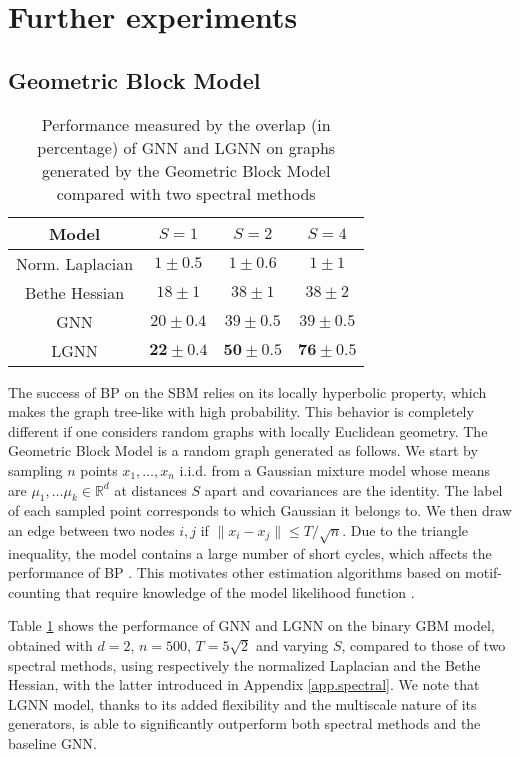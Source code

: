 \documentclass{article} \usepackage{iclr2019_conference,times}
\begin{document}
 

\section{Further experiments}
\subsection{Geometric Block Model}
\label{GBMsec}

\begin{table}[h]
\centering
\caption{\footnotesize{Performance measured by the overlap (in percentage) of GNN and LGNN on graphs generated by the Geometric Block Model compared with two spectral methods}}
\label{gbm_table}
{\small 
\begin{tabular}{|c|c|c|c|}
\hline
Model & $S=1$ & $S=2$  & $S=4$ \\
\hline 
Norm. Laplacian  & $1 \pm 0.5$ & $1 \pm 0.6$ & $1 \pm 1$ \\
Bethe Hessian & $18 \pm 1$ &  $38 \pm 1$ & $38 \pm 2$ \\
GNN & $20 \pm 0.4$  & $39 \pm 0.5$ & $39 \pm 0.5$ \\
LGNN & $\mathbf{22\pm 0.4}$  & $\mathbf{50 \pm 0.5}$ & $\mathbf{76 \pm 0.5}$ \\
\hline 
\end{tabular}
}
\end{table}


The success of BP on the SBM relies on its locally hyperbolic property, 
which makes the graph tree-like with high probability. This behavior is completely different if one 
considers random graphs with locally Euclidean geometry. 
The Geometric Block Model \citep{sankararaman2018community} is a random graph generated as follows. 
We start by sampling $n$ points $x_1,\dots, x_n$ i.i.d. from a Gaussian mixture model whose means are
$\mu_1, \dots \mu_k \in \mathbb{R}^d$ at distances $S$ apart and covariances are the identity. 
The label of each sampled point corresponds to which Gaussian it belongs to.
We then draw an edge between two nodes $i, j$ if $\| x_i - x_j\| \leq T/\sqrt{n}$. 
Due to the triangle inequality, the model contains a large number of short cycles, which affects 
the performance of BP \citep{information2009mezard}. This motivates other estimation algorithms 
based on motif-counting  that require knowledge of the model likelihood function \citep{sankararaman2018community}. 


Table \ref{gbm_table} shows the performance of GNN and LGNN on the binary GBM model, 
obtained with $d=2$, $n=500$, $T=5 \sqrt{2}$ and varying $S$, compared to those of two spectral methods, 
using respectively the normalized Laplacian and the Bethe Hessian, with the latter introduced in Appendix \ref{app.spectral}.
We note that LGNN model, thanks to its added flexibility and the multiscale nature of its generators, is able to 
significantly outperform both spectral methods and the baseline GNN.
\end{document}
